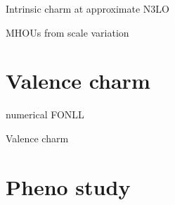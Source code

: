 \documentclass[aspectratio=43, 8pt,t]{beamer}
\begin{document}
\begin{frame}{Intrinsic charm at approximate N3LO}

\end{frame}


\begin{frame}{MHOUs from scale variation}

\end{frame}

\section{Valence charm}

\begin{frame}{numerical FONLL}

\end{frame}


\begin{frame}{Valence charm}
\end{frame}


\section{Pheno study}
\end{document}
